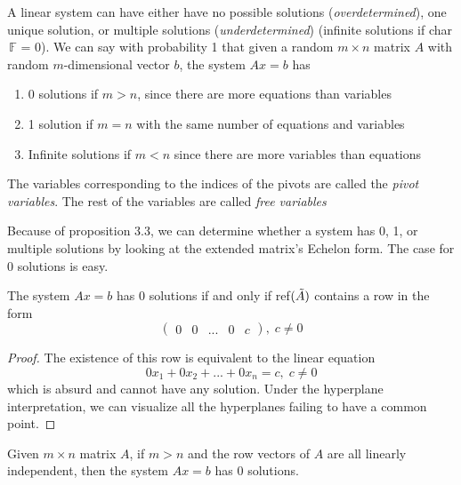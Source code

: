 \documentclass{article}
\begin{document}
    \begin{definition}
    A linear system can have either have no possible solutions (\textit{overdetermined}), one unique solution, or multiple solutions (\textit{underdetermined}) (infinite solutions if char$\, \mathbb{F}$ = 0). We can say with probability 1 that given a random $m \times n$ matrix $A$ with random $m$-dimensional vector $b$, the system $A x = b$ has
    \begin{enumerate}
        \item 0 solutions if $m > n$, since there are more equations than variables
        \item 1 solution if $m = n$ with the same number of equations and variables
        \item Infinite solutions if $m < n$ since there are more variables than equations
    \end{enumerate}
    \end{definition}

    \begin{definition}
    The variables corresponding to the indices of the pivots are called the \textit{pivot variables}. The rest of the variables are called \textit{free variables}
    \end{definition}

    Because of proposition 3.3, we can determine whether a system has 0, 1, or multiple solutions by looking at the extended matrix's Echelon form. The case for 0 solutions is easy. 

    \begin{theorem}
    The system $A x = b$ has 0 solutions if and only if ref$(\Tilde{A})$ contains a row in the form 
    \[ \begin{pmatrix}
    0 & 0 & ... & 0 & c
    \end{pmatrix}, \; c \neq 0\]
    \end{theorem}

    \begin{proof}
    The existence of this row is equivalent to the linear equation
    \[ 0 x_1 + 0 x_2 + ... + 0 x_n = c, \; c \neq 0\]
    which is absurd and cannot have any solution. Under the hyperplane interpretation, we can visualize all the hyperplanes failing to have a common point. 
    \end{proof}

    \begin{corollary}
    Given $m \times n$ matrix $A$, if $m > n$ and the row vectors of $A$ are all linearly independent, then the system $A x = b$ has 0 solutions. 
    \end{corollary}
\end{document}
